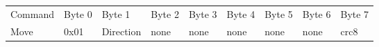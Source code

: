 \documentclass[a4paper]{article}
\begin{document}
\begin{tabular}{lllllllll}
Command &
    Byte 0 &
    Byte 1 &
    Byte 2 &
    Byte 3 &
    Byte 4 &
    Byte 5 &
    Byte 6 &
    Byte 7 \\
Move &
    0x01 &
    Direction &
    none &
    none &
    none &
    none &
    none &
    crc8 \\
\end{tabular}
\end{document}
